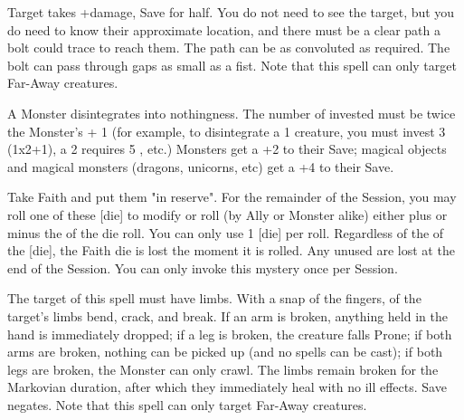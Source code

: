 {\newpage

\MYSTERY [
  Name = Doombolt,
  Link = arcana-mystery-doombolt,
  Paradigm = Force,
  Save = Y (half),
  Duration = Instant,
  Target = Far-Away Target(s)
]

Target takes \SUMDICE+\DICE damage, Save for half. You do not need to see the target, but you do need to know their approximate location, and there must be a clear path a bolt could trace to reach them. The path can be as convoluted as required. The bolt can pass through gaps as small as a fist.  Note that this spell can only target Far-Away creatures.

\MYSTERY [
  Name = Gaze of the Void,
  Link = arcana-mystery-gaze-of-the-void,
  Paradigm = Entropy,
  Save = Y (neg.),
  Duration = Instant,
  Target = Nearby or Far-Away Target(s)
]

A Monster disintegrates into nothingness. The number of \DICE invested must be twice the Monster's \HD + 1 (for example, to disintegrate a 1 \HD creature, you must invest 3 \DICE (1x2+1), a 2 \HD requires 5 \DICE, etc.) Monsters get a +2 to their Save; magical objects and magical monsters (dragons, unicorns, etc) get a +4 to their Save.



\MYSTERY [
  Name = Kismet,
  Link = arcana-mystery-kismet,
  Paradigm = Entropy,
  Save = n/a,
  Duration = Session,
  Target = See Below
]

Take \DICE Faith and put them "in reserve".  For the remainder of the Session, you may roll one of these [die] to modify  \RO or \RB roll (by Ally or Monster alike) either plus or minus the \SUMDICE of the die roll.  You can only use 1 [die] per roll.  Regardless of the \SUMDICE of the [die], the Faith die is lost the moment it is rolled.  Any unused \DICE are lost at the end of the Session.  You can only invoke this mystery once per Session.

\MYSTERY [
  Name = Limbbreaker,
  Link = arcana-mystery-limbbreaker,
  Paradigm = Biomancy,
  Save = Y (neg.),
  Duration = Markovian,
  Target = Far-Away Target(s)
]

The target of this spell must have limbs.  With a snap of the fingers, \DICE of the target's limbs bend, crack, and break.  If an arm is broken, anything held in the hand is immediately dropped; if a leg is broken, the creature falls Prone; if both arms are broken, nothing can be picked up (and no spells can be cast); if both legs are broken, the Monster can only crawl.  The limbs remain broken for the Markovian duration, after which they immediately heal with no ill effects. Save negates.  Note that this spell can only target Far-Away creatures.

}
